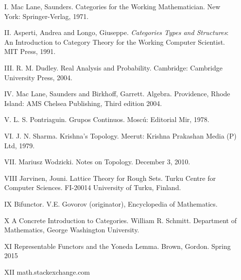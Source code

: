 \documentclass [12pt]{book}
\begin{document}
\begin{itemize}
\item[I.]Mac Lane, Saunders. Categories for the Working Mathematician. New York: Springer-Verlag, 1971.\item[II.]Asperti, Andrea and Longo, Giuseppe. \textit{Categories Types and Structures}: An Introduction to Category Theory for the Working Computer Scientist. MIT Press, 1991.\item[III.]R. M. Dudley. Real Analysis and Probability. Cambridge: Cambridge University Press, 2004.\item[IV.]Mac Lane, Saunders and  Birkhoff, Garrett. Algebra. Providence, Rhode Island: AMS Chelsea Publishing, Third edition 2004.\item[V.]L. S. Pontriaguin. Grupos Continuos. Mosc\'u: Editorial Mir, 1978.\item[VI.] J. N. Sharma. Krishna's Topology. Meerut: Krishna Prakashan Media (P) Ltd, 1979. \item[VII.]Mariusz Wodzicki. Notes on Topology. December 3, 2010.
\item[VIII]J$\ddot{a}$rvinen, Jouni. Lattice Theory for Rough Sets. Turku Centre for Computer Sciences. FI-20014 University of Turku, Finland.
\item[IX]Bifunctor. V.E. Govorov (originator), Encyclopedia of Mathematics.
\item[X]A Concrete Introduction to Categories. William R. Schmitt. Department of Mathematics, George Washington University.
\item[XI]Representable Functors and the Yoneda Lemma. Brown, Gordon. Spring 2015
\item[XII]math.stackexchange.com 
\end{itemize}
\end{document}
